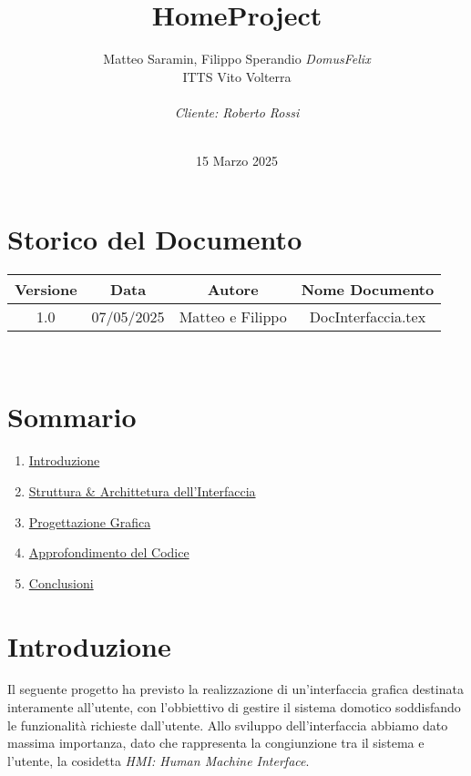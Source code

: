 \documentclass[italian, 12pt, a4paper]{article}
\title{\huge{HomeProject}}
\author{Matteo Saramin, Filippo Sperandio \textit{DomusFelix} \\ {\small ITTS Vito Volterra} \\ \\ \emph{Cliente: Roberto Rossi}}
\date{\version\\ 15 Marzo 2025}
\begin{document}
\maketitle
\section*{Storico del Documento}
\begin{center}
    \renewcommand{\arraystretch}{1.5} %
    \begin{tabular}{|c|c|c|c|}
        \hline
        \rowcolor{violet!30}
        Versione & Data & Autore & Nome Documento \\
        \hline
        1.0 & 07/05/2025 & Matteo e Filippo & DocInterfaccia.tex \\
        \hline
    \end{tabular}\\[4mm]
\end{center}
\clearpage
\section*{Sommario}
\begin{enumerate}
    \item \hyperref[sec:introduzione]{\Large Introduzione}
    \item \hyperref[sec:descrizione]{\Large Struttura \& Archittetura dell'Interfaccia}
    \item \hyperref[sec:progettazione]{\Large Progettazione Grafica}
    \item \hyperref[sec:codice]{\Large Approfondimento del Codice}
    \item \hyperref[sec:conclusioni]{\Large Conclusioni}
\end{enumerate}
\clearpage
\section{Introduzione}\label{sec:introduzione}
Il seguente progetto ha previsto la realizzazione di un'interfaccia grafica destinata interamente all'utente, con l'obbiettivo di gestire il sistema domotico soddisfando le funzionalità richieste dall'utente. Allo sviluppo dell'interfaccia abbiamo dato massima importanza, dato che rappresenta la congiunzione tra il sistema e l'utente, la cosidetta \emph{HMI: Human Machine Interface}.
\clearpage
\end{document}
